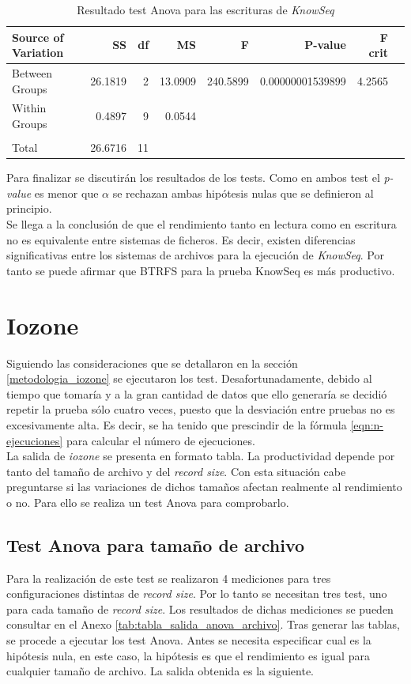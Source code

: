\begin{table}[!htp]\centering
\scriptsize
\begin{tabular}{lrrrrrrr}\toprule
Source of Variation &SS &df &MS &F &P-value &F crit \\\midrule
Between Groups &26.1819 &2 &13.0909 &240.5899 &0.00000001539899 &4.2565 \\
Within Groups &0.4897 &9 &0.0544 & & & \\
& & & & & & \\
Total &26.6716 &11 & & & & \\
\bottomrule
\end{tabular}
\caption{Resultado test Anova para las escrituras de \textit{KnowSeq}}\label{tab: }
\end{table}

Para finalizar se discutirán los resultados de los tests. Como en ambos test el \textit{p-value} es menor que $\alpha$ se rechazan ambas hipótesis nulas que se definieron al principio.\\

Se llega a la conclusión de que el rendimiento tanto en lectura como en escritura no es equivalente entre sistemas de ficheros. Es decir, existen diferencias significativas entre los sistemas de archivos para la ejecución de \textit{KnowSeq}. Por tanto se puede afirmar que BTRFS para la prueba KnowSeq es más productivo.

\section{Iozone}
Siguiendo las consideraciones que se detallaron en la sección \ref{metodologia_iozone} se ejecutaron los test. Desafortunadamente, debido al tiempo que tomaría y a la gran cantidad de datos que ello generaría se decidió repetir la prueba sólo cuatro veces, puesto que la desviación entre pruebas no es excesivamente alta. Es decir, se ha tenido que prescindir de la fórmula \ref{eqn:n-ejecuciones} para calcular el número de ejecuciones.\\

La salida de \textit{iozone} se presenta en formato tabla. La productividad depende por tanto del tamaño de archivo y del \textit{record size}. Con esta situación cabe preguntarse si las variaciones de dichos tamaños afectan realmente al rendimiento o no. Para ello se realiza un test Anova para comprobarlo.

\subsection{Test Anova para tamaño de archivo}
Para la realización de este test se realizaron 4 mediciones para tres configuraciones distintas de \textit{record size}. Por lo tanto se necesitan tres test, uno para cada tamaño de \textit{record size}.  Los resultados de dichas mediciones se pueden consultar en el Anexo \ref{tab:tabla_salida_anova_archivo}. Tras generar las tablas, se procede a ejecutar los test Anova. Antes se necesita especificar cual es la hipótesis nula, en este caso, la hipótesis es que el rendimiento es  igual para cualquier tamaño de archivo. La salida obtenida es la siguiente. 

